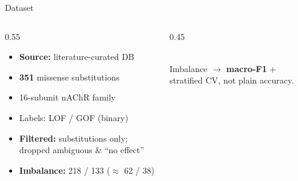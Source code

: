\documentclass[aspectratio=169]{beamer}
\begin{document}


\begin{frame}{Dataset}
\begin{columns}[T]
\begin{column}{0.55\textwidth}
\begin{itemize}\setlength\itemsep{0.4em}
  \item \textbf{Source:} literature-curated DB
  \item \textbf{351} missense substitutions
  \item 16-subunit nAChR family
  \item Labels: \textcolor{lofcolor}{LOF} / \textcolor{gofcolor}{GOF} (binary)
  \item \textbf{Filtered:} substitutions only; dropped ambiguous \& ``no effect''
  \item \textbf{Imbalance:} 218 / 133 ($\approx$ 62 / 38)
\end{itemize}
\end{column}
\begin{column}{0.45\textwidth}
\centering
{}\\[0.4cm]
\footnotesize Imbalance $\rightarrow$ \textbf{macro-F1} + stratified CV,
not plain accuracy.
\end{column}
\end{columns}
\end{frame}
\end{document}
